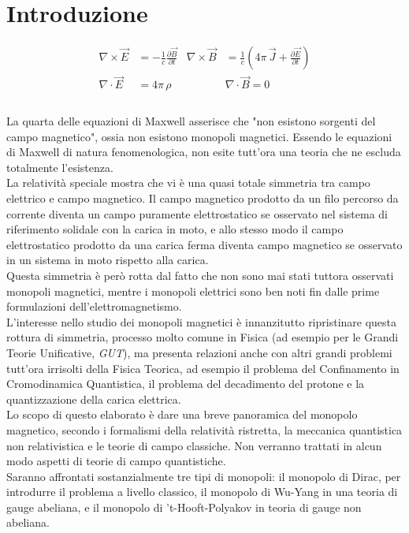 \chapter*{Introduzione}
\begin{equation*}
   \begin{aligned}
      \nabla \times \vec E & = -\frac{1}{c}\frac{\partial \vec B}{\partial t}&
      \nabla \times \vec B & = \frac{1}{c} \left(
         4\pi \, \vec J + \frac{\partial \vec E}{\partial t} \right) \\
      \nabla \cdot \vec E & = 4\pi \, \rho &
      &\boxed{\nabla \cdot \vec B = 0} \\
   \end{aligned}
\end{equation*}\\

La quarta delle equazioni di Maxwell asserisce che "non esistono sorgenti del
campo magnetico", ossia non esistono monopoli magnetici. Essendo le equazioni di
Maxwell di natura fenomenologica, non esite tutt'ora una teoria che ne escluda
totalmente l'esistenza. \\
La relatività speciale mostra che vi è una quasi totale simmetria tra campo elettrico
e campo magnetico. Il campo magnetico prodotto da un filo percorso da corrente
diventa un campo puramente elettrostatico se osservato nel sistema di riferimento
solidale con la carica in moto, e allo stesso modo il campo elettrostatico prodotto
da una carica ferma diventa campo magnetico se osservato in un sistema in moto rispetto
alla carica.\\
Questa simmetria è però rotta dal fatto che non sono mai stati tuttora osservati
monopoli magnetici, mentre i monopoli elettrici sono ben noti fin dalle prime
formulazioni dell'elettromagnetismo.\\
L'interesse nello studio dei monopoli magnetici è innanzitutto ripristinare
questa rottura di simmetria, processo molto comune in Fisica (ad esempio per le
Grandi Teorie Unificative, \emph{GUT}), ma presenta relazioni anche con altri
grandi problemi tutt'ora irrisolti della Fisica Teorica, ad esempio il problema
del Confinamento in Cromodinamica Quantistica, il problema del decadimento del
protone e la quantizzazione della carica elettrica.\\

Lo scopo di questo elaborato è dare una breve panoramica del monopolo magnetico,
secondo i formalismi della relatività ristretta, la meccanica quantistica non
relativistica e le teorie di campo classiche. Non verranno trattati in alcun modo
aspetti di teorie di campo quantistiche. \\
Saranno affrontati sostanzialmente tre tipi di monopoli: il monopolo di Dirac,
per introdurre il problema a livello classico, il monopolo di Wu-Yang in una
teoria di gauge abeliana, e il monopolo di 't-Hooft-Polyakov in teoria di gauge
non abeliana.

